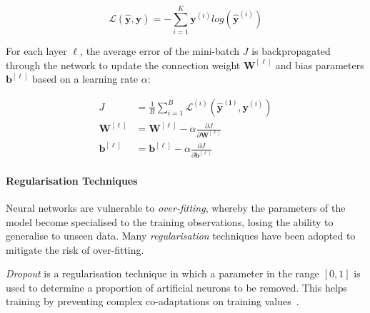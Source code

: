 \begin{equation}
  \mathcal{L}(\bm{\hat{y}}, \bm{y}) = - \sum_{i=1}^K \bm{y}^{(i)} log (\bm{\hat{y}}^{(i)})
\end{equation}

For each layer $\ell$, the average error of the mini-batch $J$ is backpropagated through the network to update the connection weight $\bm{W}^{[\ell]}$ and bias parameters $\bm{b}^{[\ell]}$ based on a learning rate $\alpha$:

\begin{align}
J &= \frac{1}{B} \sum_{i=1}^B \mathcal{L}^{(i)}(\bm{\hat{y}^{(i)}}, \bm{y}^{(i)})\\
\bm{W}^{[\ell]} &= \bm{W}^{[\ell]} - \alpha \frac{\partial J}{\partial \bm{W}^{[\ell]}}\\
\bm{b}^{[\ell]} &= \bm{b}^{[\ell]} - \alpha \frac{\partial J}{\partial \bm{b}^{[\ell]}}
\end{align}




\paragraph*{Regularisation Techniques}

Neural networks are vulnerable to \emph{over-fitting}, whereby the parameters of the model become specialised to the training observations, losing the ability to generalise to unseen data. Many \emph{regularisation} techniques have been adopted to mitigate the risk of over-fitting.

\emph{Dropout} is a regularisation technique in which a parameter in the range $[0,1]$ is used to determine a proportion of artificial neurons to be removed. This helps training by preventing complex co-adaptations on training values~\cite{Goodfellow2016}.


